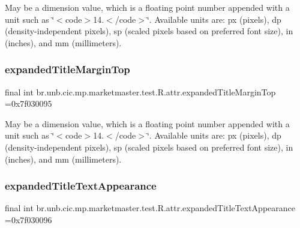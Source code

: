 May be a dimension value, which is a floating point number appended with a unit such as \char`\"{}$<$code$>$14.\+5sp$<$/code$>$\char`\"{}. Available units are\+: px (pixels), dp (density-\/independent pixels), sp (scaled pixels based on preferred font size), in (inches), and mm (millimeters). \mbox{\label{classbr_1_1unb_1_1cic_1_1mp_1_1marketmaster_1_1test_1_1R_1_1attr_a58dbac561909d49786f73e8d94921206}} 
\subsubsection{\texorpdfstring{expanded\+Title\+Margin\+Top}{expandedTitleMarginTop}}
{\footnotesize\ttfamily final int br.\+unb.\+cic.\+mp.\+marketmaster.\+test.\+R.\+attr.\+expanded\+Title\+Margin\+Top =0x7f030095\hspace{0.3cm}{\ttfamily [static]}}

May be a dimension value, which is a floating point number appended with a unit such as \char`\"{}$<$code$>$14.\+5sp$<$/code$>$\char`\"{}. Available units are\+: px (pixels), dp (density-\/independent pixels), sp (scaled pixels based on preferred font size), in (inches), and mm (millimeters). \mbox{\label{classbr_1_1unb_1_1cic_1_1mp_1_1marketmaster_1_1test_1_1R_1_1attr_a3c7e40570d75c85142e8f6e8e5a9c640}} 
\subsubsection{\texorpdfstring{expanded\+Title\+Text\+Appearance}{expandedTitleTextAppearance}}
{\footnotesize\ttfamily final int br.\+unb.\+cic.\+mp.\+marketmaster.\+test.\+R.\+attr.\+expanded\+Title\+Text\+Appearance =0x7f030096\hspace{0.3cm}{\ttfamily [static]}}

